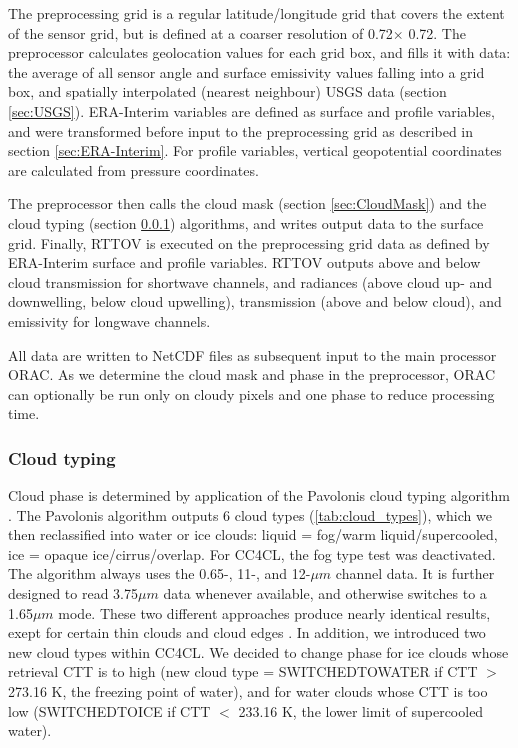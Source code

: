 The preprocessing grid is a regular latitude/longitude grid that covers the extent of the sensor grid, but is defined at a coarser resolution of 0.72\textdegree $\times$ 0.72\textdegree. The preprocessor calculates geolocation values for each grid box, and fills it with data: the average of all sensor angle and surface emissivity values falling into a grid box, and spatially interpolated (nearest neighbour) USGS data (section \ref{sec:USGS}). ERA-Interim variables are defined as surface and profile variables, and were transformed before input to the preprocessing grid as described in section \ref{sec:ERA-Interim}. For profile variables, vertical geopotential coordinates are calculated from pressure coordinates. 

The preprocessor then calls the cloud mask (section \ref{sec:CloudMask}) and the cloud typing (section \ref{sec:Pavolonis}) algorithms, and writes output data to the surface grid. Finally, RTTOV is executed on the preprocessing grid data as defined by ERA-Interim surface and profile variables. RTTOV outputs above and below cloud transmission for shortwave channels, and radiances (above cloud up- and downwelling, below cloud upwelling), transmission (above and below cloud), and emissivity for longwave channels.

All data are written to NetCDF files as subsequent input to the main processor ORAC. As we determine the cloud mask and phase in the preprocessor, ORAC can optionally be run only on cloudy pixels and one phase to reduce processing time.

\subsubsection{Cloud typing}\label{sec:Pavolonis}

Cloud phase is determined by application of the Pavolonis cloud typing algorithm \citep{Pavolonis05}. The Pavolonis algorithm outputs 6 cloud types (\cref{tab:cloud_types}), which we then reclassified into water or ice clouds: liquid = fog/warm liquid/supercooled, ice = opaque ice/cirrus/overlap. For CC4CL, the fog type test was deactivated. The algorithm always uses the 0.65-, 11-, and 12-$\mu m$ channel data. It is further designed to read 3.75$\mu m$ data whenever available, and otherwise switches to a 1.65$\mu m$ mode. These two different approaches produce nearly identical results, exept for certain thin clouds and cloud edges \citep{Pavolonis05}. In addition, we introduced two new cloud types within CC4CL. We decided to change phase for ice clouds whose retrieval CTT is to high (new cloud type = SWITCHED\textunderscore TO\textunderscore WATER if CTT $>$ 273.16 K, the freezing point of water), and for water clouds whose CTT is too low (SWITCHED\textunderscore TO\textunderscore ICE if CTT $<$ 233.16 K, the lower limit of supercooled water).

